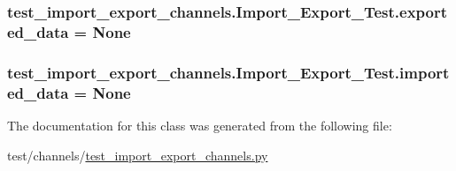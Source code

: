 \subsubsection[{exported\+\_\+data}]{\setlength{\rightskip}{0pt plus 5cm}test\+\_\+import\+\_\+export\+\_\+channels.\+Import\+\_\+\+Export\+\_\+\+Test.\+exported\+\_\+data = None\hspace{0.3cm}{\ttfamily [static]}}\label{classtest__import__export__channels_1_1Import__Export__Test_a525fbee2a5d043600226e8384f78fde9}
\hypertarget{classtest__import__export__channels_1_1Import__Export__Test_a78e070574094839452508d9b8f5589f3}{}
\subsubsection[{imported\+\_\+data}]{\setlength{\rightskip}{0pt plus 5cm}test\+\_\+import\+\_\+export\+\_\+channels.\+Import\+\_\+\+Export\+\_\+\+Test.\+imported\+\_\+data = None\hspace{0.3cm}{\ttfamily [static]}}\label{classtest__import__export__channels_1_1Import__Export__Test_a78e070574094839452508d9b8f5589f3}


The documentation for this class was generated from the following file\+:\begin{DoxyCompactItemize}
\item 
test/channels/\hyperlink{test__import__export__channels_8py}{test\+\_\+import\+\_\+export\+\_\+channels.\+py}\end{DoxyCompactItemize}
